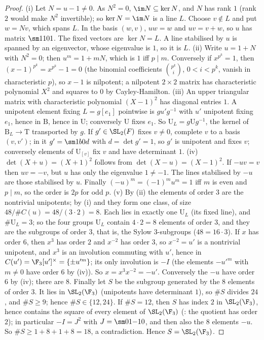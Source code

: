 \begin{proof}
(i) Let $N=u-1\ne0$. As $N^2=0$, $\im N\subseteq\ker N$, and $N$ has rank $1$ (rank $2$ would make $N^2$ invertible); so $\ker N=\im N$ is a line $L$. Choose
$v\notin L$ and put $w=Nv$, which spans $L$. In the basis $(w,v)$, $uw=w$ and $uv=v+w$, so $u$ has matrix $\sm1101$. The fixed vectors are $\ker N=L$. A line
stabilised by $u$ is spanned by an eigenvector, whose eigenvalue is $1$, so it is $L$. (ii) Write $u=1+N$ with $N^2=0$; then $u^m=1+mN$, which is $1$ iff
$p\mid m$. Conversely if $x^{p^k}=1$, then $(x-1)^{p^k}=x^{p^k}-1=0$ (the binomial coefficients $\binom{p^k}i$, $0<i<p^k$, vanish in characteristic $p$), so $x-1$
is nilpotent; a nilpotent $2\times2$ matrix has characteristic polynomial $X^2$ and squares to $0$ by Cayley-Hamilton. (iii) An upper triangular matrix
with characteristic polynomial $(X-1)^2$ has diagonal entries $1$. A unipotent element fixing $L=g[e_1]$ pointwise is $gu'g^{-1}$ with $u'$ unipotent fixing
$e_1$, hence in $\mathrm B$, hence in $\mathrm U$; conversely $\mathrm U$ fixes $e_1$. So $\mathrm U_L=g\mathrm Ug^{-1}$, the kernel of $\mathrm B_L\to\mathrm T$ transported by $g$. If $g'\in\SL_2(F)$
fixes $v\ne0$, complete $v$ to a basis $(v,v')$; in it $g'=\sm1b0d$ with $d=\det g'=1$, so $g'$ is unipotent and fixes $v$; conversely elements of $\mathrm U_{[v]}$
fix $v$ and have determinant $1$. (iv) $\det(X+u)=(X+1)^2$ follows from $\det(X-u)=(X-1)^2$. If $-uv=v$ then $uv=-v$, but $u$ has only the eigenvalue
$1\ne-1$. The lines stabilised by $-u$ are those stabilised by $u$. Finally $(-u)^m=(-1)^mu^m=1$ iff $m$ is even and $p\mid m$, so the order is $2p$ for
odd $p$. (v) By (ii) the elements of order $3$ are the nontrivial unipotents; by (i) and  they form one class, of size
$48/\#C(u)=48/(3\cdot2)=8$. Each lies in exactly one $\mathrm U_L$ (its fixed line), and $\#\mathrm U_L=3$; so the four groups $\mathrm U_L$ contain $4\cdot2=8$ elements of order $3$,
and they are the subgroups of order $3$, that is, the Sylow $3$-subgroups ($48=16\cdot3$). If $x$ has order $6$, then $x^3$ has order $2$ and $x^{-2}$ has order
$3$, so $x^{-2}=u'$ is a nontrivial unipotent, and $x^3$ is an involution commuting with $u'$, hence in $C(u')=\F_3[u']^\times=\{\pm u'^m\}$; its only involution
is $-I$ (the elements $-u'^m$ with $m\ne0$ have order $6$ by (iv)). So $x=x^3x^{-2}=-u'$. Conversely the $-u$ have order $6$ by (iv); there are $8$.
Finally let $S$ be the subgroup generated by the $8$ elements of order $3$. It lies in $\SL_2(\F_3)$ (unipotents have determinant $1$), so $\#S$ divides $24$, and
$\#S\ge9$; hence $\#S\in\{12,24\}$. If $\#S=12$, then $S$ has index $2$ in $\SL_2(\F_3)$, hence contains the square of every element of $\SL_2(\F_3)$
(: the quotient has order $2$); in particular $-I=J^2$ with $J=\sm01{-1}0$, and then also the $8$ elements $-u$. So $\#S\ge1+8+1+8=18$, a
contradiction. Hence $S=\SL_2(\F_3)$.
\end{proof}

